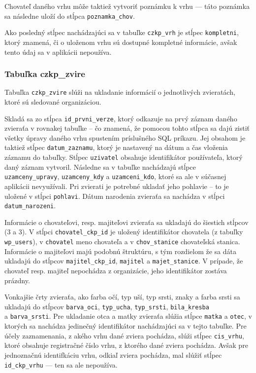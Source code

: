 Chovateľ daného vrhu môže taktiež vytvoriť poznámku k vrhu --- táto poznámka sa následne uloží do stĺpca \texttt{poznamka_chov}.

Ako posledný stĺpec nachádzajúci sa v tabuľke \texttt{czkp_vrh} je stĺpec \texttt{kompletni}, ktorý znamená, či o uloženom vrhu sú dostupné kompletné informácie, avšak tento údaj sa v aplikácii nepoužíva.

\subsubsection*{Tabuľka czkp\_zvire}

Tabuľka \texttt{czkp_zvire} slúži na ukladanie informácií o jednotlivých zvieratách, ktoré sú sledované organizáciou.

Skladá sa zo stĺpca \texttt{id_prvni_verze}, ktorý odkazuje na prvý záznam daného zvieraťa v rovnakej tabuľke -- čo znamená, že pomocou tohto stĺpca sa dajú zistiť všetky úpravy daného vrhu spustením príslušného SQL príkazu.
Jej obsahom je taktiež stĺpec \texttt{datum_zaznamu}, ktorý je nastavený na dátum a čas vloženia záznamu do tabuľky. Stĺpec \texttt{uzivatel} obsahuje identifikátor používateľa, ktorý daný záznam vytvoril. Následne sa v tabuľke nachádzajú stĺpce \texttt{uzamceny_upravy}, \texttt{uzamceny_kdy} a \texttt{uzamceni_kdo}, ktoré sa ale v súčasnej aplikácii nevyužívali. Pri zvierati je potrebné ukladať jeho pohlavie -- to je uložené v stĺpci \texttt{pohlavi}. Dátum narodenia zvieraťa sa nachádza v stĺpci \texttt{datum_narozeni}.

Informácie o chovateľovi, resp. majiteľovi zvieraťa sa ukladajú do šiestich stĺpcov (3 a 3). V stĺpci \texttt{chovatel_ckp_id} je uložený identifikátor chovatela (z tabuľky \texttt{wp_users}), v \texttt{chovatel} meno chovateľa a v \texttt{chov_stanice} chovateľská stanica. Informácie o majiteľovi majú podobnú štruktúru, s tým rozdielom že sa dáta ukladajú do stĺpcov \texttt{majitel_ckp_id}, \texttt{majitel} a \texttt{majet_stanice}. V prípade, že chovateľ resp. majiteľ nepochádza z organizácie, jeho identifikátor zostáva prázdny.

Vonkajšie črty zvieraťa, ako farba očí, typ uší, typ srsti, znaky a farba srsti sa ukladajú do stĺpcov \texttt{barva_oci}, \texttt{typ_ucha}, \texttt{typ_srsti}, \texttt{bila_kresba} \\ a \texttt{barva_srsti}.
Pre ukladanie otca a matky zvieraťa slúžia stĺpce \texttt{matka} a \texttt{otec}, v ktorých sa nachádza jedinečný identifikátor nachádzajúci sa v tejto tabuľke. Pre účely zaznamenania, z akého vrhu dané zviera pochádza, slúži stĺpec \texttt{cis_vrhu}, ktoré obsahuje registračné číslo vrhu, z ktorého dané zviera pochádza. Avšak pre jednoznačnú identifkáciu vrhu, odkiaľ zviera pochádza, mal slúžiť stĺpec \texttt{id_ckp_vrhu} --- ten sa ale nepoužíva.

